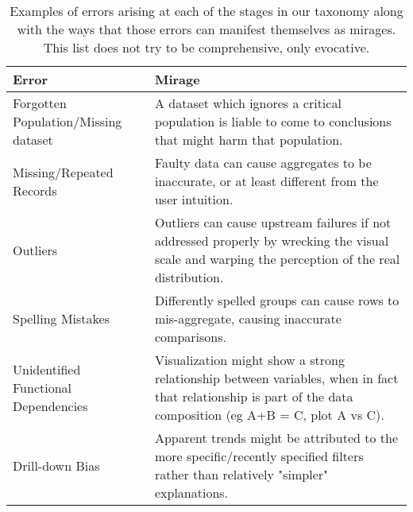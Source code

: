 
\begin{table*}[]
\centering
\caption{Examples of errors arising at each of the stages in our taxonomy along with the ways that those errors can manifest themselves as mirages. This list does not try to be comprehensive, only evocative.}
\small
\begin{tabular}{p{5cm}p{12cm}}
\normalsize{Error} & \normalsize{Mirage}\\ \hline
   \rowcolor{colora}\multirow{6}{0em}{\hspace{-0.6cm}\rotatebox{90}{\normalsize{Curating}}}Forgotten Population/Missing dataset & A dataset which ignores a critical population is liable to come to conclusions that might harm that population. \cite{missingdatasets, correll2019ethical}\\
 \rowcolor{colora-opaque}Missing/Repeated Records & Faulty data can cause aggregates to be inaccurate, or at least different from the user intuition. \cite{kim2003taxonomy} \\
 \rowcolor{colora}Outliers & Outliers can cause upstream failures if not addressed properly by wrecking the visual scale and warping the perception of the real distribution.  \cite{kim2003taxonomy} \\
 \rowcolor{colora-opaque}Spelling Mistakes & Differently spelled groups can cause rows to mis-aggregate, causing inaccurate comparisons. \cite{wang2019uni}\\
 \rowcolor{colora}Unidentified Functional Dependencies & Visualization might show a strong relationship between variables, when in fact that relationship is part of the data composition (eg A+B = C, plot A vs C). \cite{wang2019uni}\\
 \rowcolor{colora-opaque}Drill-down Bias & Apparent trends might be attributed to the more specific/recently specified filters rather than relatively "simpler" explanations. \cite{lee2019avoiding}\\


\end{tabular}
\end{table*}
